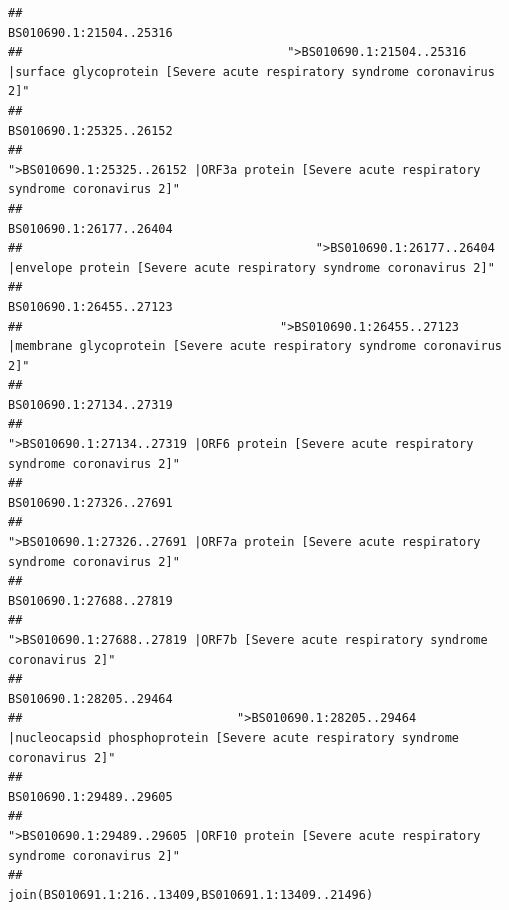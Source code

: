 \documentclass[
]{article}
\begin{document}
\begin{verbatim}
##                                                                                                                BS010690.1:21504..25316 
##                                     ">BS010690.1:21504..25316 |surface glycoprotein [Severe acute respiratory syndrome coronavirus 2]" 
##                                                                                                                BS010690.1:25325..26152 
##                                            ">BS010690.1:25325..26152 |ORF3a protein [Severe acute respiratory syndrome coronavirus 2]" 
##                                                                                                                BS010690.1:26177..26404 
##                                         ">BS010690.1:26177..26404 |envelope protein [Severe acute respiratory syndrome coronavirus 2]" 
##                                                                                                                BS010690.1:26455..27123 
##                                    ">BS010690.1:26455..27123 |membrane glycoprotein [Severe acute respiratory syndrome coronavirus 2]" 
##                                                                                                                BS010690.1:27134..27319 
##                                             ">BS010690.1:27134..27319 |ORF6 protein [Severe acute respiratory syndrome coronavirus 2]" 
##                                                                                                                BS010690.1:27326..27691 
##                                            ">BS010690.1:27326..27691 |ORF7a protein [Severe acute respiratory syndrome coronavirus 2]" 
##                                                                                                                BS010690.1:27688..27819 
##                                                    ">BS010690.1:27688..27819 |ORF7b [Severe acute respiratory syndrome coronavirus 2]" 
##                                                                                                                BS010690.1:28205..29464 
##                              ">BS010690.1:28205..29464 |nucleocapsid phosphoprotein [Severe acute respiratory syndrome coronavirus 2]" 
##                                                                                                                BS010690.1:29489..29605 
##                                            ">BS010690.1:29489..29605 |ORF10 protein [Severe acute respiratory syndrome coronavirus 2]" 
##                                                                                    join(BS010691.1:216..13409,BS010691.1:13409..21496) 

\end{verbatim}
\end{document}
